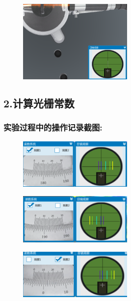 \documentclass{article}
\begin{document}
    \begin{figure}[H]
        \centering
        \includegraphics[width=0.5\textwidth]{24.png}
        \end{figure}
       
\subsection*{2.计算光栅常数}

\subsubsection*{实验过程中的操作记录截图:}

\begin{figure}[H]
    \centering
    \includegraphics[width=0.5\textwidth]{11.png}
    \end{figure}

    \begin{figure}[H]
        \centering
        \includegraphics[width=0.5\textwidth]{12.png}
        \end{figure}
        \begin{figure}[H]
            \centering
            \includegraphics[width=0.5\textwidth]{13.png}
            \end{figure}
\end{document}
